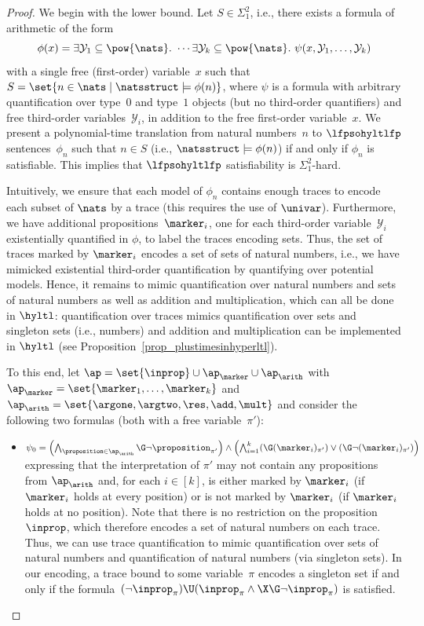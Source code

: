 \begin{proof}
We begin with the lower bound. Let $S \in \Sigma_1^2$, i.e., there exists a formula of arithmetic of the form
\[
\phi(x) = \exists \mathcal{Y}_1\subseteq \pow{\nats}.\ \cdots \exists \mathcal{Y}_k\subseteq \pow{\nats}. \ \psi(x, \mathcal{Y}_1, \ldots,\mathcal{Y}_k)
\]
with a single free (first-order) variable~$x$ such that $S = \set{n \in\nats \mid \natsstruct\models\phi(n) }$, where $\psi$ is a formula with arbitrary quantification over type~$0$ and type~$1$ objects (but no third-order quantifiers) and free third-order variables~$\mathcal{Y}_i$, in addition to the free first-order variable~$x$.
We present a polynomial-time translation from natural numbers~$n$ to $\lfpsohyltlfp$ sentences~$\phi_n$ such that $n \in S$ (i.e., $\natsstruct \models \phi(n)$) if and only if $\phi_n$ is satisfiable.
This implies that $\lfpsohyltlfp$ satisfiability is $\Sigma_1^2$-hard.

Intuitively, we ensure that each model of $\phi_n$ contains enough traces to encode each subset of $\nats$ by a trace (this requires the use of $\univar$). 
Furthermore, we have additional propositions~$\marker_i$, one for each third-order variable~$\mathcal{Y}_i$ existentially quantified in $\phi$, to label the traces encoding sets.
Thus, the set of traces marked by $\marker_i$ encodes a set of sets of natural numbers, i.e., we have mimicked existential third-order quantification by quantifying over potential models. 
Hence, it remains to mimic quantification over natural numbers and sets of natural numbers as well as addition and multiplication, which can all be done in $\hyltl$: quantification over traces mimics quantification over sets and singleton sets (i.e., numbers) and addition and multiplication can be implemented in $\hyltl$ (see Proposition~\ref{prop_plustimesinhyperltl}). 

To this end, let $\ap = \set{\inprop} \cup \ap_\marker \cup \ap_\arith$ with $\ap_\marker = \set{\marker_1,\ldots, \marker_k}$ and $\ap_\arith = \set{ \argone, \argtwo, \res, \add, \mult}$ and consider the following two formulas (both with a free variable~$\pi'$):
\begin{itemize}
    \item $\psi_0 = \left(\bigwedge_{\proposition \in \ap_\arith} \G\neg\proposition_{\pi'}\right) \wedge \left(\bigwedge_{i=1}^k (\G (\marker_i)_{\pi'}) \vee (\G\neg(\marker_i)_{\pi'})\right)$ expressing that the interpretation of $\pi'$ may not contain any propositions from $\ap_\arith$ and, for each $i \in [k]$, is either marked by $\marker_i$ (if $\marker_i$ holds at every position) or is not marked by $\marker_i$ (if $\marker_i$ holds at no position). Note that there is no restriction on the proposition~$\inprop$, which therefore encodes a set of natural numbers on each trace. 
    Thus, we can use trace quantification to mimic quantification over sets of natural numbers and quantification of natural numbers (via singleton sets).
    In our encoding, a trace bound to some variable~$\pi$ encodes a singleton set if and only if the formula~$(\neg \inprop_{\pi})\U(\inprop_{\pi} \wedge \X\G\neg \inprop_{\pi}) $ is satisfied.
    

\end{itemize}
\end{proof}
